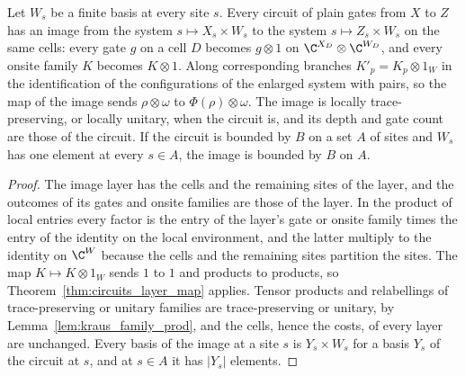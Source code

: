 \begin{theorem}
    \label{thm:circuits_tensor_right}
    \leanok
    Let $W_s$ be a finite basis at every site $s$. Every circuit of plain gates from
    $X$ to $Z$ has an image from the system $s\mapsto X_s\times W_s$ to the system
    $s\mapsto Z_s\times W_s$ on the same cells: every gate $g$ on a cell $D$ becomes
    $g\otimes1$ on $\C^{X_D}\otimes\C^{W_D}$, and every onsite family $K$ becomes
    $K\otimes1$. Along corresponding branches $K'_p=K_p\otimes1_W$ in the
    identification of the configurations of the enlarged system with pairs, so the map of the image sends $\rho\otimes\omega$ to $\Phi(\rho)\otimes\omega$. The
    image is locally trace-preserving, or locally unitary, when the circuit is, and its
    depth and gate count are those of the circuit. If the circuit is bounded by $B$ on a set
    $A$ of sites and $W_s$ has one element at every $s\in A$, the image is bounded by $B$
    on $A$.
\end{theorem}
\begin{proof}\leanok
    The image layer has the cells and the remaining sites of the layer, and the
    outcomes of its gates and onsite families are those of the layer. In the product of
    local entries every factor is the entry of the layer's gate or onsite family times
    the entry of the identity on the local environment, and the latter multiply to the
    identity on $\C^W$ because the cells and the remaining sites partition the sites.
    The map $K\mapsto K\otimes1_W$ sends $1$ to $1$ and products to products, so
    Theorem~\ref{thm:circuits_layer_map} applies. Tensor products and relabellings of
    trace-preserving or unitary families are trace-preserving or unitary, by
    Lemma~\ref{lem:kraus_family_prod}, and the cells, hence the costs, of every layer
    are unchanged. Every basis of the image at a site $s$ is $Y_s\times W_s$ for a basis $Y_s$
    of the circuit at $s$, and at $s\in A$ it has $\lvert Y_s\rvert$ elements.
\end{proof}

